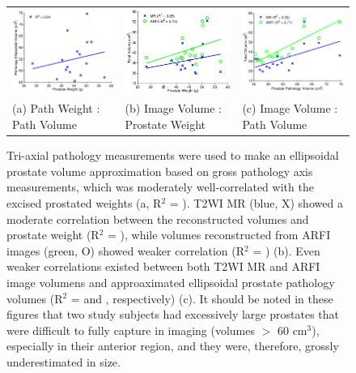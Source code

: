 \begin{figure}[htb!]
\centering
\begin{tabular}{lll}
\includegraphics[width=0.3\linewidth]{figs/corr_path_vol_weight_vol} &
\includegraphics[width=0.3\linewidth]{figs/corr_weight_vol} &
\includegraphics[width=0.3\linewidth]{figs/corr_pathVol_vol} \\
(a) Path Weight : Path Volume & (b) Image Volume : Prostate Weight & (c) Image Volume : Path Volume \\
\end{tabular}
\caption{Tri-axial pathology measurements were used to make an ellipsoidal
    prostate volume approximation based on gross pathology axis measurements,
    which was moderately well-correlated with the excised prostated weights (a,
    R$^2$ = \pathVolWeightRsq).  T2WI MR (blue, X) showed a moderate
    correlation between the reconstructed volumes and prostate weight (R$^2$ =
    \weightMRrsq), while volumes reconstructed from ARFI images (green, O)
    showed weaker correlation (R$^2$ = \weightARFIrsq) (b).  Even weaker
    correlations existed between both T2WI MR and ARFI image volumens and
    approaximated ellipsoidal prostate pathology volumes (R$^2$ = \pathVolMRrsq
    and \pathVolARFIrsq, respectively) (c).  It should be noted in these
    figures that two study subjects had excessively large prostates that were
    difficult to fully capture in imaging (volumes $>$ 60 cm$^3$), especially
    in their anterior region, and they were, therefore, grossly underestimated
    in size.}
\label{fig:mr_arfi_weight}
\end{figure}
